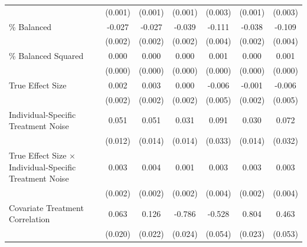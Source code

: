\documentclass[12pt]{article}
\begin{document}
\begin{table}[htbp]
{\begin{tabular}{p{4.5in}|*{6}{c}}
                    &     (0.001)         &     (0.001)         &     (0.001)         &     (0.003)         &     (0.001)         &     (0.003)         \\
\% Balanced         &      -0.027\sym{***}&      -0.027\sym{***}&      -0.039\sym{***}&      -0.111\sym{***}&      -0.038\sym{***}&      -0.109\sym{***}\\
                    &     (0.002)         &     (0.002)         &     (0.002)         &     (0.004)         &     (0.002)         &     (0.004)         \\
\% Balanced Squared &       0.000\sym{***}&       0.000\sym{***}&       0.000\sym{***}&       0.001\sym{***}&       0.000\sym{***}&       0.001\sym{***}\\
                    &     (0.000)         &     (0.000)         &     (0.000)         &     (0.000)         &     (0.000)         &     (0.000)         \\
True Effect Size    &       0.002         &       0.003         &       0.000         &      -0.006         &      -0.001         &      -0.006         \\
                    &     (0.002)         &     (0.002)         &     (0.002)         &     (0.005)         &     (0.002)         &     (0.005)         \\
Individual-Specific Treatment Noise&       0.051\sym{***}&       0.051\sym{***}&       0.031\sym{*}  &       0.091\sym{**} &       0.030\sym{*}  &       0.072\sym{*}  \\
                    &     (0.012)         &     (0.014)         &     (0.014)         &     (0.033)         &     (0.014)         &     (0.032)         \\
True Effect Size $\times$ Individual-Specific Treatment Noise&       0.003\sym{*}  &       0.004\sym{*}  &       0.001         &       0.003         &       0.003         &       0.003         \\
                    &     (0.002)         &     (0.002)         &     (0.002)         &     (0.004)         &     (0.002)         &     (0.004)         \\
Covariate Treatment Correlation&       0.063\sym{**} &       0.126\sym{***}&      -0.786\sym{***}&      -0.528\sym{***}&       0.804\sym{***}&       0.463\sym{***}\\
                    &     (0.020)         &     (0.022)         &     (0.024)         &     (0.054)         &     (0.023)         &     (0.053)         \\

\end{tabular}}
\end{table}
\end{document}
